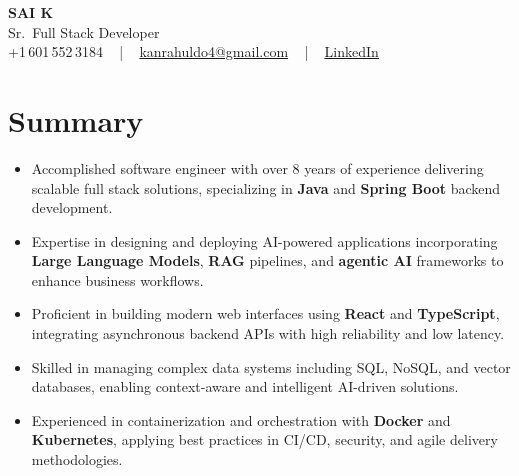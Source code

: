 \documentclass[letterpaper,11pt]{article}
\newcommand{\resumeItem}[1]{
  \item\footnotesize{
    {#1 \vspace{-2pt}}
  }
}
\newcommand{\resumeItemListStart}{\begin{itemize}[leftmargin=*]}
\newcommand{\resumeItemListEnd}{\end{itemize}\vspace{-5pt}}
\begin{document}
\begin{center}
    {\fontsize{14pt}{12pt}\selectfont \textbf{\MakeUppercase{Sai K}}}\\ \vspace{2pt}
    \fontsize{10pt}{12pt}\selectfont Sr.\ Full Stack Developer\\ \vspace{2pt}
    \fontsize{10pt}{12pt}\selectfont +1\,601\,552\,3184 ~ | ~
    \href{mailto:kanrahuldo4@gmail.com}{kanrahuldo4@gmail.com} ~ | ~
    \href{https://www.linkedin.com/in/srrrk/}{\color{blue}\underline{LinkedIn}}
    \vspace{-10pt}
\end{center}

\section{Summary}
\fontsize{9pt}{10pt}\selectfont
\resumeItemListStart
  \resumeItem{Accomplished software engineer with over 8 years of experience delivering scalable full stack solutions, specializing in \textbf{Java} and \textbf{Spring Boot} backend development.}
  \resumeItem{Expertise in designing and deploying AI-powered applications incorporating \textbf{Large Language Models}, \textbf{RAG} pipelines, and \textbf{agentic AI} frameworks to enhance business workflows.}
  \resumeItem{Proficient in building modern web interfaces using \textbf{React} and \textbf{TypeScript}, integrating asynchronous backend APIs with high reliability and low latency.}
  \resumeItem{Skilled in managing complex data systems including SQL, NoSQL, and vector databases, enabling context-aware and intelligent AI-driven solutions.}
  \resumeItem{Experienced in containerization and orchestration with \textbf{Docker} and \textbf{Kubernetes}, applying best practices in CI/CD, security, and agile delivery methodologies.}
\resumeItemListEnd
\vspace{-6pt}

\end{document}
